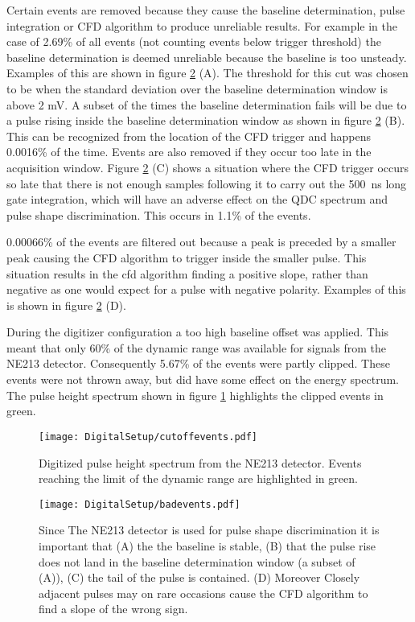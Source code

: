 \documentclass[main.tex]{subfiles}
\begin{document}
Certain events are removed because they cause the baseline determination, pulse integration or CFD algorithm to produce unreliable results. For example in the case of 2.69\% of all events (not counting events below trigger threshold) the baseline determination is deemed unreliable because the baseline is too unsteady. 
Examples of this are shown in figure \ref{fig:badevents} (A). The threshold for this cut was chosen to be when the standard deviation over the baseline determination window is above 2 mV. 
A subset of the times the baseline determination fails will be due to a pulse rising inside the baseline determination window as shown in figure \ref{fig:badevents} (B). This can be recognized from the location of the CFD trigger and happens 0.0016\% of the time. Events are also removed if they occur too late in the acquisition window. Figure \ref{fig:badevents} (C) shows a situation where the CFD trigger occurs so late that there is not enough samples following it to carry out the \si{500 \nano\second} long gate integration, which will have an adverse effect on the QDC spectrum and pulse shape discrimination. This occurs in 1.1\% of the events.

0.00066\% of the events are filtered out because a peak is preceded by a smaller peak causing the CFD algorithm to trigger inside the smaller pulse. This situation results in the cfd algorithm finding a positive slope, rather than negative as one would expect for a pulse with negative polarity. Examples of this is shown in figure \ref{fig:badevents} (D).

During the digitizer configuration a too high baseline offset was applied. This meant that only 60\% of the dynamic range was available for signals from the NE213 detector. Consequently 5.67\% of the events were partly clipped. These events were not thrown away, but did have some effect on the energy spectrum. The pulse height spectrum shown in figure \ref{fig:cutoffevents} highlights the clipped events in green.
\begin{figure}[ht!]
    \centering
        \texttt{[image: DigitalSetup/cutoffevents.pdf]}
        \caption[Digitized pulse height spectrum]{Digitized pulse height spectrum from the NE213 detector. Events reaching the limit of the dynamic range are highlighted in green.}
    \label{fig:cutoffevents} 
\end{figure}

\begin{figure}[ht!]
    \centering
        \texttt{[image: DigitalSetup/badevents.pdf]}
        \caption[Examples of rejected digitized events]{Since The NE213 detector is used for pulse shape discrimination it is important that (A) the the baseline is stable, (B) that the pulse rise does not land in the baseline determination window (a subset of (A)), (C) the tail of the pulse is contained. (D) Moreover Closely adjacent pulses may on rare occasions cause the CFD algorithm to find a slope of the wrong sign.}
    \label{fig:badevents} 
\end{figure}
\end{document}
